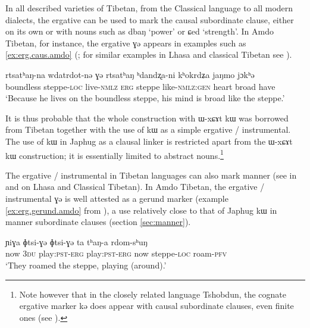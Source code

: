 \documentclass[oldfontcommands,oneside,a4paper,11pt]{article}
\newcommand{\ipa}[1]{{\phon #1}} %
\begin{document}
In all described varieties of Tibetan, from the Classical language to all modern dialects, the ergative can be used to mark the causal subordinate clause, either on its own or with nouns such as \ipa{dbaŋ} `power' or \ipa{ɕed} `strength'. In Amdo Tibetan, for instance, the ergative \ipa{ɣə} appears in examples such as \ref{ex:erg.caus.amdo} (\citealt[271-272]{vbrugmo03maqu}; for similar examples in Lhasa and classical Tibetan see \citealt[129]{tournadre96erg}).
 \begin{exe} 
\ex \label{ex:erg.caus.amdo}
\gll  \ipa{kʰokjaŋwi} 	\ipa{rtsatʰaŋ-na} 	\ipa{wdatrdot-nə} 	\ipa{ɣə} 	\ipa{rtsatʰaŋ} 	\ipa{ʰdandʐa-ni} 	\ipa{kʰokrdʑa} 	\ipa{jaŋmo} 	\ipa{jɔkʰə}  \\
boundless steppe-\textsc{loc} live-\textsc{nmlz} \textsc{erg} steppe like-\textsc{nmlz:gen} heart broad have \\
\glt  `Because he lives on the boundless steppe, his mind is broad like the steppe.'
\end{exe}  
 
It is thus probable that the whole construction with \ipa{ɯ-xɕɤt kɯ} was borrowed from Tibetan together with the use of \ipa{kɯ} as a simple ergative / instrumental. The use of  \ipa{kɯ} in Japhug as a clausal linker is restricted apart from the  \ipa{ɯ-xɕɤt kɯ} construction; it is essentially limited to  abstract nouns.\footnote{Note however that in the closely related language Tshobdun, the cognate ergative marker \ipa{kə} does appear with causal subordinate clauses, even finite ones (see \citealt[479]{sun12complementation}).}

The ergative / instrumental in Tibetan languages can also mark manner (see in  \citealt[128]{tournadre96erg} and \citet{tournadre10cases} on Lhasa and Classical Tibetan). In Amdo Tibetan, the ergative / instrumental \ipa{ɣə} is well attested as a gerund marker (example \ref{ex:erg.gerund.amdo} from \citealt[162; 167]{haller04themchen}), a use relatively close to that of Japhug \ipa{kɯ} in manner subordinate clauses (section \ref{sec:manner}).

 \begin{exe} 
\ex \label{ex:erg.gerund.amdo}
\gll   \ipa{ta} 	\ipa{ɲiɣa} 	\ipa{ɸtsi-ɣə} 	\ipa{ɸtsi-ɣə} 	\ipa{ta} 	\ipa{tʰaŋ-a} 	\ipa{rdom-sʰuŋ}  \\
now \textsc{3du} play:\textsc{pst}-\textsc{erg} play:\textsc{pst}-\textsc{erg} now steppe-\textsc{loc} roam-\textsc{pfv} \\
\glt  `They roamed the steppe, playing (around).'
\end{exe}  
\end{document}
